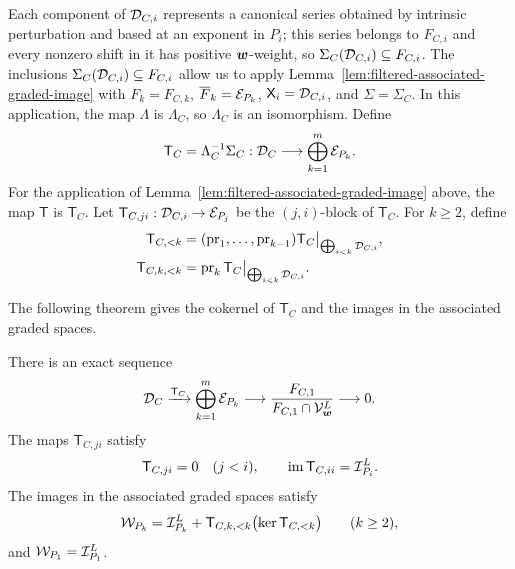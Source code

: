 Each component of \(\mathcal D_{C,i}\) represents a canonical series obtained by intrinsic perturbation and based at an exponent in \(P_i\); this series belongs to \(F_{C,i}\) and every nonzero shift in it has positive \(\boldsymbol{w}\)-weight, so \(\Sigma_C(\mathcal D_{C,i})\subseteq F_{C,i}\).
The inclusions \(\Sigma_C(\mathcal D_{C,i})\subseteq F_{C,i}\) allow us to apply Lemma~\ref{lem:filtered-associated-graded-image} with \(F_k=F_{C,k}\), \(\overline F_k=\mathcal E_{P_k}\), \(\mathsf X_i=\mathcal D_{C,i}\), and \(\Sigma=\Sigma_C\).
In this application, the map \(\Lambda\) is \(\Lambda_C\), so \(\Lambda_C\) is an isomorphism.
Define
\begin{equation}
	\mathsf T_C
	=
	\Lambda_C^{-1}\Sigma_C:
	\mathcal D_C
	\longrightarrow
	\bigoplus_{k=1}^m\mathcal E_{P_k}.
	\label{eq:formal-transition-map}
\end{equation}
For the application of Lemma~\ref{lem:filtered-associated-graded-image} above, the map \(\mathsf T\) is \(\mathsf T_C\).
Let \(\mathsf T_{C,ji}:\mathcal D_{C,i}\to\mathcal E_{P_j}\) be the \((j,i)\)-block of \(\mathsf T_C\).
For \(k\geq2\), define
\begin{align}
	\mathsf T_{C,<k}
	&=
	(\operatorname{pr}_1,\ldots,\operatorname{pr}_{k-1})
	\mathsf T_C
	\big|_{\bigoplus_{i<k}\mathcal D_{C,i}},
	\label{eq:formal-transition-preceding-map}\\
	\mathsf T_{C,k,<k}
	&=
	\operatorname{pr}_k
	\mathsf T_C
	\big|_{\bigoplus_{i<k}\mathcal D_{C,i}}.
	\label{eq:formal-transition-current-map}
\end{align}

The following theorem gives the cokernel of \(\mathsf T_C\) and the images in the associated graded spaces.

\begin{theorem}
	\label{thm:formal-solution-exact-cokernel}
	There is an exact sequence
	\begin{equation}
		\mathcal D_C
		\xrightarrow{\mathsf T_C}
		\bigoplus_{k=1}^m\mathcal E_{P_k}
		\longrightarrow
		\frac{F_{C,1}}
		{F_{C,1}\cap\mathcal V_{\boldsymbol{w}}^{L}}
		\longrightarrow0.
		\label{eq:formal-transition-cokernel}
	\end{equation}
	The maps \(\mathsf T_{C,ji}\) satisfy
	\begin{equation}
		\mathsf T_{C,ji}=0\quad(j<i),
		\qquad
		\operatorname{im}\mathsf T_{C,ii}
		=
		\mathcal I_{P_i}^{L}.
		\label{eq:formal-transition-diagonal}
	\end{equation}
	The images in the associated graded spaces satisfy
	\begin{equation}
		\mathcal W_{P_k}
		=
		\mathcal I_{P_k}^{L}
		+
		\mathsf T_{C,k,<k}
		\bigl(\ker\mathsf T_{C,<k}\bigr)
		\qquad(k\geq2),
		\label{eq:formal-transition-associated-graded-image}
	\end{equation}
	and \(\mathcal W_{P_1}=\mathcal I_{P_1}^{L}\).
\end{theorem}

